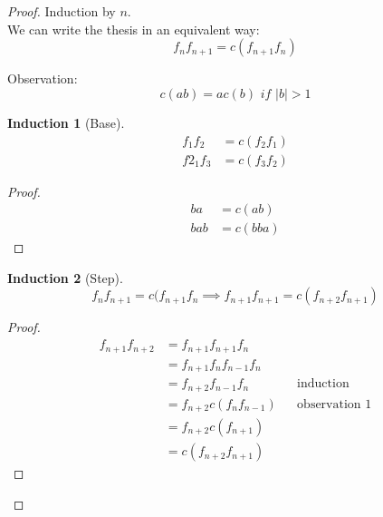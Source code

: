 \documentclass{scrartcl}
\newtheorem{theorem}{Induction}
\begin{document}
\section{}
  \begin{proof}
    Induction by $n$. \\
    We can write the thesis in an equivalent way:
    \[f_nf_{n+1} = c(f_{n+1}f_n)\]
    
    Observation:
    \begin{equation}
      c(ab) = ac(b) \textit{ if } |b| > 1
    \end{equation}
    
    \begin{theorem}[Base]
      \begin{equation}
        \begin{split}
          f_1f_2 &= c(f_2f_1)\\
          f2_1f_3 &= c(f_3f_2)
        \end{split}
      \end{equation}
    \end{theorem}
    \begin{proof}
      \begin{equation}
        \begin{split}
          ba &= c(ab)\\
          bab &= c(bba)
        \end{split}
      \end{equation}
    \end{proof}
    
    
    \begin{theorem}[Step]
      \begin{equation}
        f_nf_{n+1} = c(f_{n+1}f_n \implies f_{n+1}f_{n+1} = c(f_{n+2}f_{n+1})
      \end{equation}
    \end{theorem}
    \begin{proof}
      \begin{equation}
        \begin{split}
          f_{n+1}f_{n+2} &= f_{n+1}f_{n+1}f_n \\
          &= f_{n+1}f_nf_{n-1}f_n \\
          &= f_{n+2}f_{n-1}f_n && \text{induction}\\
          &= f_{n+2}c(f_nf_{n-1}) && \text{observation 1}\\
          &= f_{n+2}c(f_{n+1}) \\
          &= c(f_{n+2}f_{n+1})
        \end{split}
      \end{equation}
    \end{proof}
  \end{proof}
  
 
\end{document}
